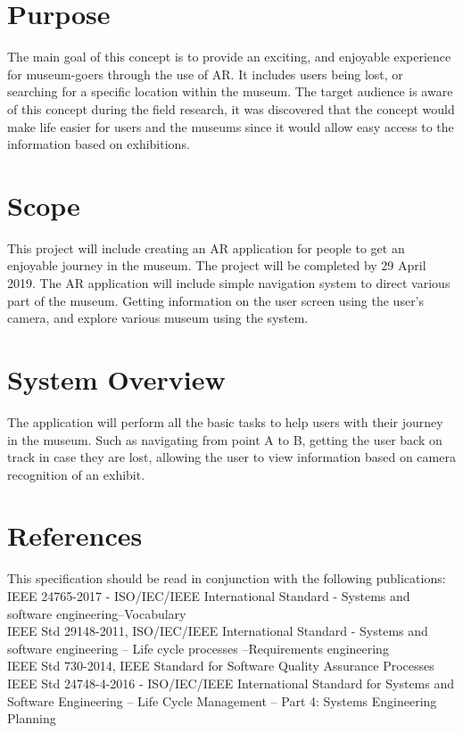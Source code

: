 
\section{Purpose}
The main goal of this concept is to provide an exciting, and enjoyable experience for museum-goers through the use of AR. It includes users being lost, or searching for a specific location within the museum. The target audience is aware of this concept during the field research, it was discovered that the concept would make life easier for users and the museums since it would allow easy access to the information based on exhibitions.

\section{Scope}
This project will include creating an AR application for people to get an enjoyable journey in the museum. The project will be completed by 29 April 2019. The AR application will include simple navigation system to direct various part of the museum. Getting information on the user screen using the user's camera, and explore various museum using the system. 

\section{System Overview}
The application will perform all the basic tasks to help users with their journey in the museum. Such as navigating from point A to B, getting the user back on track in case they are lost, allowing the user to view information based on camera recognition of an exhibit.

\section{References}
This specification should be read in conjunction with the following publications:\\
IEEE 24765-2017 - ISO/IEC/IEEE International Standard - Systems and software engineering--Vocabulary \cite{IEEE24765}\\
IEEE Std 29148-2011, ISO/IEC/IEEE International Standard - Systems and software engineering -- Life cycle processes --Requirements engineering \cite{IEEE29148} \\
IEEE Std 730-2014, IEEE Standard for Software Quality Assurance Processes \cite{IEEE730} \\
IEEE Std 24748-4-2016 - ISO/IEC/IEEE International Standard for Systems and Software Engineering -- Life Cycle Management -- Part 4: Systems Engineering Planning \cite{IEEE24748}

